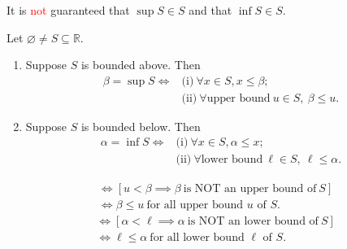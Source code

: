 \documentclass[11pt,openany]{article}
\begin{document}
\begin{remark*}[\textcolor{red}{\bf Caution!}]
	It is \textcolor{red}{not} guaranteed that $\sup S\in S$ and that $\inf S\in S$.
\end{remark*}
\begin{remark*}
	Let $\varnothing\neq S\subseteq\mathbb{R}$. \begin{enumerate}[(1)]
		\item Suppose $S$ is bounded above. Then \begin{align*}
			\beta=\sup S \iff&\text{(i)}\ \forall x\in S, x\leq\beta;\\
			&\text{(ii)}\ \forall\text{upper bound}\ u\in S,\ \beta\leq u.
		\end{align*}
		\item Suppose $S$ is bounded below. Then \begin{align*}
			\alpha=\inf S \iff&\text{(i)}\ \forall x\in S, \alpha\leq x;\\
			&\text{(ii)}\ \forall \text{lower bound}\ \ell\in S,\ \ell\leq \alpha.
		\end{align*}
	\end{enumerate} 
\end{remark*}
\begin{remark*}
	\begin{align*}
		[u\ \text{is any upper bound of}\ S\implies \beta\leq u]&\iff [u<\beta\implies\beta\ \text{is NOT an upper bound of}\ S]\\
		&\iff \beta\leq u\ \text{for all upper bound $u$ of $S$}.
	\end{align*}
	\begin{align*}
		[\ell\ \text{is any lower bound of}\ S\implies \ell\leq\alpha]&\iff [\alpha<\ell\implies\alpha\ \text{is NOT an lower bound of}\ S]\\
		&\iff \ell\leq \alpha\ \text{for all lower bound $\ell$ of $S$}.
	\end{align*}
\end{remark*}
\end{document}
